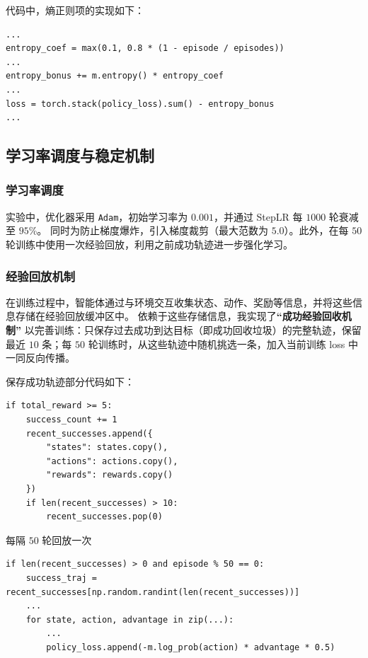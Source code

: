 代码中，熵正则项的实现如下：
\begin{verbatim}
...
entropy_coef = max(0.1, 0.8 * (1 - episode / episodes))
...
entropy_bonus += m.entropy() * entropy_coef
...
loss = torch.stack(policy_loss).sum() - entropy_bonus
...
\end{verbatim}

\subsection{学习率调度与稳定机制}

\subsubsection{学习率调度}

实验中，优化器采用 \texttt{Adam}，初始学习率为 \(0.001\)，并通过 StepLR 每 \(1000\) 轮衰减至 \(95\)\%。
同时为防止梯度爆炸，引入梯度裁剪（最大范数为 \(5.0\)）。此外，在每 \(50\) 轮训练中使用一次经验回放，利用之前成功轨迹进一步强化学习。

\subsubsection{经验回放机制}

在训练过程中，智能体通过与环境交互收集状态、动作、奖励等信息，并将这些信息存储在经验回放缓冲区中。
依赖于这些存储信息，我实现了\textbf{“成功经验回收机制”} 以完善训练：只保存过去成功到达目标（即成功回收垃圾）的完整轨迹，保留最近 \(10\) 条；每 \(50\) 轮训练时，从这些轨迹中随机挑选一条，加入当前训练 loss 中一同反向传播。


保存成功轨迹部分代码如下：

\begin{verbatim}
if total_reward >= 5:
    success_count += 1
    recent_successes.append({
        "states": states.copy(),
        "actions": actions.copy(),
        "rewards": rewards.copy()
    })
    if len(recent_successes) > 10:
        recent_successes.pop(0)
\end{verbatim}

每隔 \(50\) 轮回放一次

\begin{verbatim}
if len(recent_successes) > 0 and episode % 50 == 0:
    success_traj = recent_successes[np.random.randint(len(recent_successes))]
    ...
    for state, action, advantage in zip(...):
        ...
        policy_loss.append(-m.log_prob(action) * advantage * 0.5)
\end{verbatim}


